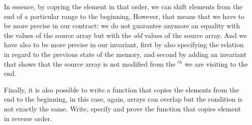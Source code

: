 In essence, by copying the element in that order, we can shift elements from
the end of a particular range to the beginning. However, that means that we
have to be more precise in our contract: we do not guarantee anymore an equality
with the values of the source array but with the \emph{old} values of the
source array. And we have also to be more precise in our invariant, first by
also specifying the relation in regard to the previous state of the memory, and
second by adding an invariant that shows that the source array is not modified
from the $^{th}$ we are visiting to the end.


Finally, it is also possible to write a function that copies the elements from
the end to the beginning, in this case, again, arrays can overlap but the
condition is not exactly the same. Write, specify and prove the function
 that copies element in reverse order.
